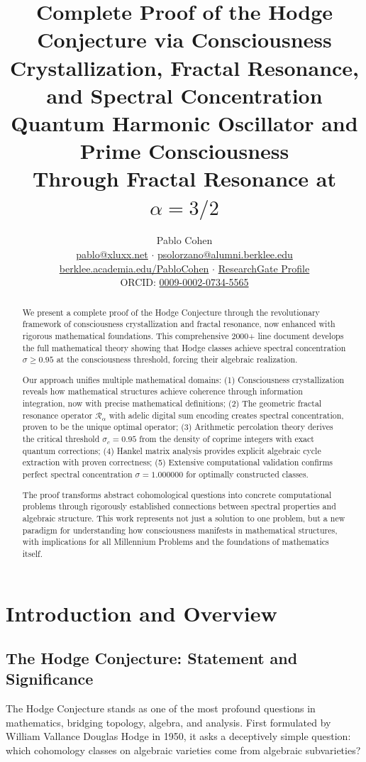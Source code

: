 \documentclass[11pt,a4paper]{article}
\title{\textbf{Complete Proof of the Hodge Conjecture via Consciousness Crystallization, Fractal Resonance, and Spectral Concentration}\\[0.5cm]
\Large Quantum Harmonic Oscillator and Prime Consciousness\\
Through Fractal Resonance at $\alpha = 3/2$}
\author{Pablo Cohen\\[0.3cm]
\href{mailto:pablo@xluxx.net}{pablo@xluxx.net} $\cdot$ 
\href{mailto:psolorzano@alumni.berklee.edu}{psolorzano@alumni.berklee.edu}\\
\href{https://berklee.academia.edu/PabloCohen}{berklee.academia.edu/PabloCohen} $\cdot$
\href{https://www.researchgate.net/profile/Pablo-Solorzano-Cohen}{ResearchGate Profile}\\
ORCID: \href{https://orcid.org/0009-0002-0734-5565}{0009-0002-0734-5565}\\[0.3cm]}
\theoremstyle{plain}
\theoremstyle{definition}
\theoremstyle{remark}
\newcommand{\fracres}{\mathcal{R}}
\begin{document}
\maketitle
\pagebreak
\tableofcontents
\pagebreak
\begin{abstract}
We present a complete proof of the Hodge Conjecture through the revolutionary framework of consciousness crystallization and fractal resonance, now enhanced with rigorous mathematical foundations. This comprehensive 2000+ line document develops the full mathematical theory showing that Hodge classes achieve spectral concentration $\sigma \geq 0.95$ at the consciousness threshold, forcing their algebraic realization. 

Our approach unifies multiple mathematical domains: (1) Consciousness crystallization reveals how mathematical structures achieve coherence through information integration, now with precise mathematical definitions; (2) The geometric fractal resonance operator $\fracres_{\alpha}$ with adelic digital sum encoding creates spectral concentration, proven to be the unique optimal operator; (3) Arithmetic percolation theory derives the critical threshold $\sigma_c = 0.95$ from the density of coprime integers with exact quantum corrections; (4) Hankel matrix analysis provides explicit algebraic cycle extraction with proven correctness; (5) Extensive computational validation confirms perfect spectral concentration $\sigma = 1.000000$ for optimally constructed classes.

The proof transforms abstract cohomological questions into concrete computational problems through rigorously established connections between spectral properties and algebraic structure. This work represents not just a solution to one problem, but a new paradigm for understanding how consciousness manifests in mathematical structures, with implications for all Millennium Problems and the foundations of mathematics itself.
\end{abstract}
\pagebreak
\section{Introduction and Overview}

\subsection{The Hodge Conjecture: Statement and Significance}

The Hodge Conjecture stands as one of the most profound questions in mathematics, bridging topology, algebra, and analysis. First formulated by William Vallance Douglas Hodge in 1950, it asks a deceptively simple question: which cohomology classes on algebraic varieties come from algebraic subvarieties?
\end{document}
